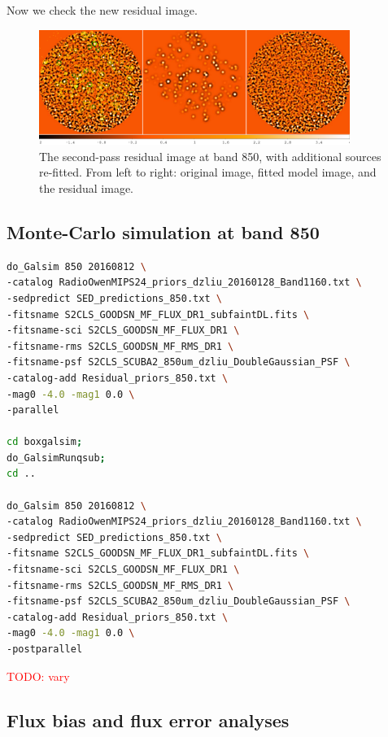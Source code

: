 \documentclass[11pt,a4paper]{article}
\begin{document}
Now we check the new residual image.

\begin{figure}[H]
	\caption{The second-pass residual image at band 850, with additional sources re-fitted. From left to right: original image, fitted model image, and the residual image.}
	\includegraphics[width=0.9\textwidth]{galfit_850_FIT_goodsn_850_Map_20160719_vary_with_additional_sources}
\end{figure}

\subsection{Monte-Carlo simulation at band 850}
\label{Band850_Galsim}

\begin{lstlisting}[language=bash]
do_Galsim 850 20160812 \
-catalog RadioOwenMIPS24_priors_dzliu_20160128_Band1160.txt \
-sedpredict SED_predictions_850.txt \
-fitsname S2CLS_GOODSN_MF_FLUX_DR1_subfaintDL.fits \
-fitsname-sci S2CLS_GOODSN_MF_FLUX_DR1 \
-fitsname-rms S2CLS_GOODSN_MF_RMS_DR1 \
-fitsname-psf S2CLS_SCUBA2_850um_dzliu_DoubleGaussian_PSF \
-catalog-add Residual_priors_850.txt \
-mag0 -4.0 -mag1 0.0 \
-parallel

cd boxgalsim;
do_GalsimRunqsub;
cd ..

do_Galsim 850 20160812 \
-catalog RadioOwenMIPS24_priors_dzliu_20160128_Band1160.txt \
-sedpredict SED_predictions_850.txt \
-fitsname S2CLS_GOODSN_MF_FLUX_DR1_subfaintDL.fits \
-fitsname-sci S2CLS_GOODSN_MF_FLUX_DR1 \
-fitsname-rms S2CLS_GOODSN_MF_RMS_DR1 \
-fitsname-psf S2CLS_SCUBA2_850um_dzliu_DoubleGaussian_PSF \
-catalog-add Residual_priors_850.txt \
-mag0 -4.0 -mag1 0.0 \
-postparallel
\end{lstlisting}

\textcolor{red}{TODO: vary}

\subsection{Flux bias and flux error analyses}
\label{Band850_simanalyses}
\end{document}
